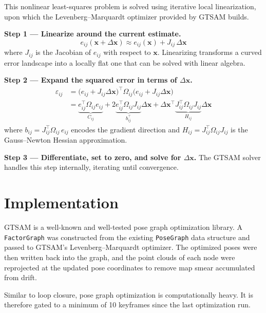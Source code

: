 \documentclass[12pt]{report}
\begin{document}
This nonlinear least-squares problem is solved using iterative local linearization, upon which the
Levenberg--Marquardt optimizer provided by GTSAM builds.

\textbf{Step 1 --- Linearize around the current estimate.}
\begin{equation}
    e_{ij}(\mathbf{x} + \Delta\mathbf{x})
        \approx e_{ij}(\mathbf{x}) + J_{ij}\,\Delta\mathbf{x}
\end{equation}
where $J_{ij}$ is the Jacobian of $e_{ij}$ with respect to $\mathbf{x}$.
Linearizing transforms a curved error landscape into a locally flat one that can be solved with
linear algebra.

\textbf{Step 2 --- Expand the squared error in terms of $\Delta\mathbf{x}$.}
\begin{align}
    \varepsilon_{ij}
        &= \bigl(e_{ij} + J_{ij}\Delta\mathbf{x}\bigr)^\top
           \Omega_{ij}
           \bigl(e_{ij} + J_{ij}\Delta\mathbf{x}\bigr) \nonumber \\
        &= \underbrace{e_{ij}^\top \Omega_{ij} e_{ij}}_{C_{ij}}
         + 2\underbrace{e_{ij}^\top \Omega_{ij} J_{ij}}_{b_{ij}^\top}\Delta\mathbf{x}
         + \Delta\mathbf{x}^\top
           \underbrace{J_{ij}^\top \Omega_{ij} J_{ij}}_{H_{ij}}
           \Delta\mathbf{x}
    \label{eq:expand}
\end{align}
where $b_{ij} = J_{ij}^\top\Omega_{ij}\,e_{ij}$ encodes the gradient direction and
$H_{ij} = J_{ij}^\top\Omega_{ij}J_{ij}$ is the Gauss--Newton Hessian approximation.

\textbf{Step 3 --- Differentiate, set to zero, and solve for $\Delta\mathbf{x}$.}
The GTSAM solver handles this step internally, iterating until convergence.

\section{Implementation}

GTSAM is a well-known and well-tested pose graph optimization library.
A \texttt{FactorGraph} was constructed from the existing \texttt{PoseGraph} data structure and
passed to GTSAM's Levenberg--Marquardt optimizer.
The optimized poses were then written back into the graph, and the point clouds of each node were
reprojected at the updated pose coordinates to remove map smear accumulated from drift.

Similar to loop closure, pose graph optimization is computationally heavy.
It is therefore gated to a minimum of 10 keyframes since the last optimization run.
\end{document}
